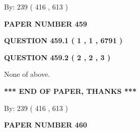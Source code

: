 \documentclass[12pt]{article}
\begin{document}
   
\hspace{1.0in} By: 
 239 ( 416 ,  613 )
   
   
   
   
\newpage 
\setcounter{page}{ 
   459001 } 
   
   
   
   
 {\textbf{ \Large{ PAPER NUMBER  459  }}}
   
   
\vspace{0.2in}
   
   
   
   
   
   
 \vspace{0.2in}
 
 
 
 
   
   
  
\vspace{0.2in}
  
{\textbf{\Large{QUESTION
459.1 
 ( 1 , 1 , 6791 )
}}}
  
  
  
\vspace{0.2in}
  
{\textbf{\Large{QUESTION
459.2 
 ( 2 , 2 , 3 )
}}}
  
  
 
 
\noindent{}
 
 
 None of above.
 
 
 
 
   
   
 \vspace{0.2in}
 
   
   
   
   
\vspace{1.0in} 
{\textbf{\large{ *** END OF PAPER, THANKS *** }}} 
   
   
\hspace{1.0in} By: 
 239 ( 416 ,  613 )
   
   
   
   
\newpage 
\setcounter{page}{ 
   460001 } 
   
   
   
   
 {\textbf{ \Large{ PAPER NUMBER  460  }}}
   
   
\vspace{0.2in}
   
\end{document}
